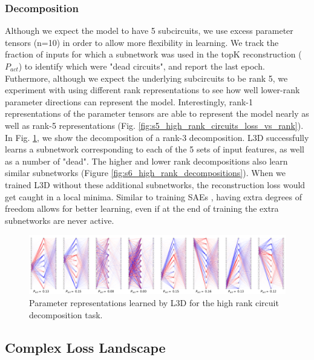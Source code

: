 \documentclass{article}
\theoremstyle{plain}
\theoremstyle{definition}
\theoremstyle{remark}
\begin{document}
\subsubsection{Decomposition}

Although we expect the model to have 5 subcircuits, we use excess parameter tensors (n=10) in order to allow more flexibility in learning. We track the fraction of inputs for which a subnetwork was used in the topK reconstruction ($P_{act}$) to identify which were "dead circuits", and report the last epoch. Futhermore, although we expect the underlying subcircuits to be rank 5, we experiment with using different rank representations to see how well lower-rank parameter directions can represent the model. Interestingly, rank-1 representations of the parameter tensors are able to represent the model nearly as well as rank-5 representations (Fig. \ref{fig:s5_high_rank_circuits_loss_vs_rank}). In Fig. \ref{fig:7_high_rank_decomposition}, we show the decomposition of a rank-3 decomposition. L3D successfully learns a subnetwork corresponding to each of the 5 sets of input features, as well as a number of "dead". The higher and lower rank decompositions also learn similar subnetworks (Figure \ref{fig:s6_high_rank_decompositions}). When we trained L3D without these additional subnetworks, the reconstruction loss would get caught in a local minima. Similar to training SAEs \cite{cunningham2023sparse}, having extra degrees of freedom allows for better learning, even if at the end of training the extra subnetworks are never active.


\begin{figure}[htbp]
    \centerline{\includegraphics[width=\textwidth]{../figures/7_high_rank_decomposition.pdf}}
    \centering
    \caption{Parameter representations learned by L3D for the high rank circuit decomposition task.}\label{fig:7_high_rank_decomposition}
\end{figure}


\subsection{Complex Loss Landscape}
\end{document}
